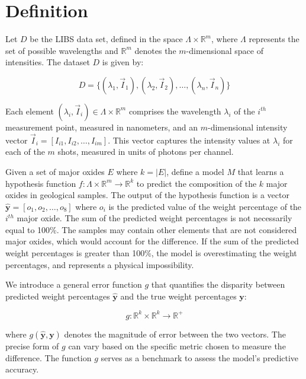 \section{Definition}\label{sec:definition}
Let $D$ be the LIBS data set, defined in the space $\Lambda \times \mathbb{R}^m$, where $\Lambda$ represents the set of possible wavelengths and $\mathbb{R}^m$ denotes the $m$-dimensional space of intensities.
The dataset $D$ is given by:

\begin{equation}
    D = \{ (\lambda_1, \vec{I}_1), (\lambda_2, \vec{I}_2), \ldots, (\lambda_n, \vec{I}_n) \}
\end{equation}

Each element $(\lambda_i, \vec{I}_i) \in \Lambda \times \mathbb{R}^{m}$ comprises the wavelength $\lambda_i$ of the $i^{th}$ measurement point, measured in nanometers, and an $m$-dimensional intensity vector $\vec{I}_i = [I_{i1}, I_{i2}, \ldots, I_{im}]$.
This vector captures the intensity values at $\lambda_i$ for each of the $m$ shots, measured in units of photons per channel.

Given a set of major oxides $E$ where $k=|E|$, define a model $M$ that learns a hypothesis function $f: \Lambda \times \mathbb{R}^m \rightarrow \mathbb{R}^k$ to predict the composition of the $k$ major oxides in geological samples.
The output of the hypothesis function is a vector $\mathbf{\hat{y}} = [o_{1}, o_{2}, \ldots, o_{8}]$ where $o_{i}$ is the predicted value of the weight percentage of the $i^{th}$ major oxide.
The sum of the predicted weight percentages is not necessarily equal to 100\%.
The samples may contain other elements that are not considered major oxides, which would account for the difference.
If the sum of the predicted weight percentages is greater than 100\%, the model is overestimating the weight percentages, and represents a physical impossibility.

We introduce a general error function $g$ that quantifies the disparity between predicted weight percentages $\mathbf{\hat{y}}$ and the true weight percentages $\mathbf{y}$:

\begin{equation}
g: \mathbb{R}^k \times \mathbb{R}^k \rightarrow \mathbb{R}^+
\end{equation}

where $g(\mathbf{\hat{y}}, \mathbf{y})$ denotes the magnitude of error between the two vectors.
The precise form of $g$ can vary based on the specific metric chosen to measure the difference. The function $g$ serves as a benchmark to assess the model's predictive accuracy.


